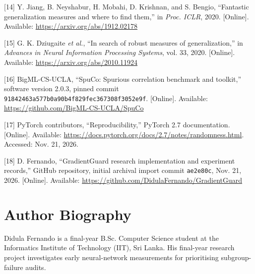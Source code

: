 [14]  Y. Jiang, B. Neyshabur, H. Mobahi, D. Krishnan, and S. Bengio, ``Fantastic generalization measures and where to find them,'' in \emph{Proc. ICLR}, 2020. [Online]. Available: \url{https://arxiv.org/abs/1912.02178}

[15]  G. K. Dziugaite \emph{et al.}, ``In search of robust measures of generalization,'' in \emph{Advances in Neural Information Processing Systems}, vol. 33, 2020. [Online]. Available: \url{https://arxiv.org/abs/2010.11924}

[16]  BigML-CS-UCLA, ``SpuCo: Spurious correlation benchmark and toolkit,'' software version 2.0.3, pinned commit \texttt{91842463a577b0a90b4f829fec367308f3052e9f}. [Online]. Available: \url{https://github.com/BigML-CS-UCLA/SpuCo}

[17]  PyTorch contributors, ``Reproducibility,'' PyTorch 2.7 documentation. [Online]. Available: \url{https://docs.pytorch.org/docs/2.7/notes/randomness.html}. Accessed: Nov. 21, 2026.

[18]  D. Fernando, ``GradientGuard research implementation and experiment records,'' GitHub repository, initial archival import commit \texttt{ae2e80c}, Nov. 21, 2026. [Online]. Available: \url{https://github.com/DidulaFernando/GradientGuard}





\section*{Author Biography}
Didula Fernando is a final-year B.Sc. Computer Science student at the Informatics Institute of Technology (IIT), Sri Lanka. His final-year research project investigates early neural-network measurements for prioritising subgroup-failure audits.

